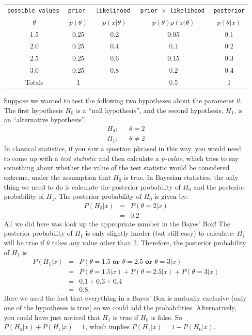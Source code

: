 \begin{table}[!ht]
\begin{center}
\begin{tabular}{|c|c|c|c|c|}
\hline
\tt{possible values} & \tt{prior} & \tt{likelihood} & \tt{prior} $\times$ \tt{likelihood} & \tt{posterior}\\
$\theta$ & $p(\theta)$ & $p(x|\theta)$ & $p(\theta)p(x|\theta)$ & $p(\theta|x)$\\
\hline
1.5 & 0.25 & 0.2 & 0.05 & 0.1\\
2.0 & 0.25 & 0.4 & 0.1 & 0.2\\
2.5 & 0.25 & 0.6 & 0.15 & 0.3\\
3.0 & 0.25 & 0.8 & 0.2 & 0.4\\
\hline
Totals & 1 & & 0.5 & 1\\
\hline
\end{tabular}
\end{center}
\end{table}
Suppose we wanted to test the following two hypotheses about the parameter $\theta$.
The first hypothesis $H_0$ is a ``null hypothesis'', and the second hypothesis,
$H_1$, is an ``alternative hypothesis''.
\begin{eqnarray}
H_0: && \theta = 2\\
H_1: && \theta \neq 2
\end{eqnarray}
In classical statistics, if you saw a question phrased in this way, you would
need to come up with a {\it test statistic}
and then calculate a {\it p-value}, which tries to say something about whether
the value of the test statistic would be considered extreme, under the
assumption that $H_0$ is true.
In Bayesian statistics, the only thing we need to do is calculate
the posterior probability of $H_0$ and the posterior probability of $H_1$.
The posterior probability of $H_0$ is given by:
\begin{eqnarray}
P(H_0|x) &=& P(\theta = 2|x)\\
&=& 0.2
\end{eqnarray}
All we did here was look up the appropriate number in the Bayes' Box! The
posterior probability of $H_1$ is only slightly harder (but still easy)
to calculate: $H_1$ will
be true if $\theta$ takes any value other than 2. Therefore, the posterior
probability of $H_1$ is
\begin{eqnarray}
P(H_1|x) &=& P(\theta = 1.5 \textbf{ or } \theta = 2.5 \textbf{ or } \theta = 3|x)\\
&=& P(\theta = 1.5|x) + P(\theta = 2.5|x) + P(\theta = 3|x)\\
&=& 0.1 + 0.3 + 0.4\\
&=& 0.8.
\end{eqnarray}
Here we used the fact that everything in a Bayes' Box is mutually exclusive
(only one of the hypotheses is true) so we could add the probabilities.
Alternatively, you could have just noticed that $H_1$ is true if $H_0$ is false.
So $P(H_0|x) + P(H_1|x) = 1$, which implies $P(H_1|x) = 1 - P(H_0|x)$.

